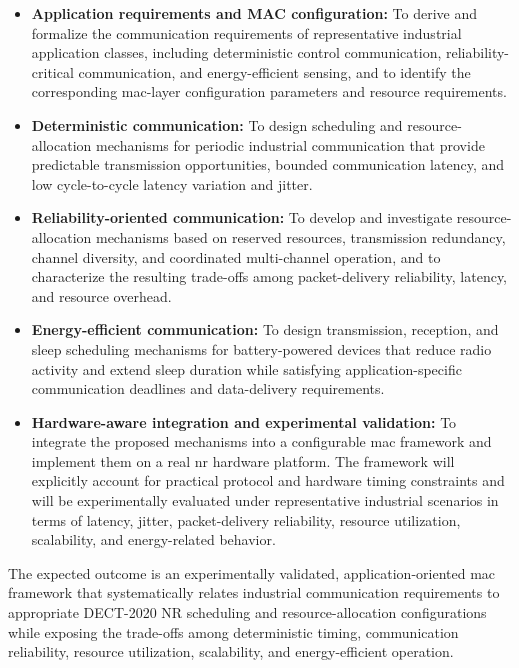\documentclass[12pt,a4paper]{article}
\begin{document}
\begin{itemize}

\item \textbf{Application requirements and MAC configuration:}
To derive and formalize the communication requirements of representative
industrial application classes, including deterministic control communication,
reliability-critical communication, and energy-efficient sensing, and to
identify the corresponding \gls{mac}-layer configuration parameters and
resource requirements.

\item \textbf{Deterministic communication:}
To design scheduling and resource-allocation mechanisms for periodic industrial
communication that provide predictable transmission opportunities, bounded
communication latency, and low cycle-to-cycle latency variation and jitter.

\item \textbf{Reliability-oriented communication:}
To develop and investigate resource-allocation mechanisms based on reserved
resources, transmission redundancy, channel diversity, and coordinated
multi-channel operation, and to characterize the resulting trade-offs among
packet-delivery reliability, latency, and resource overhead.

\item \textbf{Energy-efficient communication:}
To design transmission, reception, and sleep scheduling mechanisms for
battery-powered devices that reduce radio activity and extend sleep duration
while satisfying application-specific communication deadlines and
data-delivery requirements.

\item \textbf{Hardware-aware integration and experimental validation:}
To integrate the proposed mechanisms into a configurable \gls{mac} framework
and implement them on a real \gls{nr} hardware platform. The framework will
explicitly account for practical protocol and hardware timing constraints and
will be experimentally evaluated under representative industrial scenarios in
terms of latency, jitter, packet-delivery reliability, resource utilization,
scalability, and energy-related behavior.

\end{itemize}

The expected outcome is an experimentally validated, application-oriented
\gls{mac} framework that systematically relates industrial communication
requirements to appropriate DECT-2020 NR scheduling and resource-allocation
configurations while exposing the trade-offs among deterministic timing,
communication reliability, resource utilization, scalability, and
energy-efficient operation.
\end{document}

